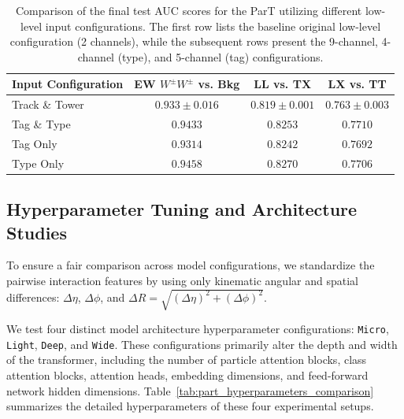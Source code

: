 \documentclass[12pt]{article}
\begin{document}
        \begin{table}[htbp]
            \centering
            \caption{Comparison of the final test AUC scores for the ParT utilizing different low-level input configurations. The first row lists the baseline original low-level configuration (2 channels), while the subsequent rows present the 9-channel, 4-channel (type), and 5-channel (tag) configurations.}
            \label{tab:refined_low_level_comparison}
            \begin{tabular}{l|ccc}
                \hline
                \hline
                Input Configuration & EW $W^\pm W^\pm$ vs. Bkg & LL vs. TX         & LX vs. TT         \\ \hline
                Track \& Tower      & $0.933 \pm 0.016$        & $0.819 \pm 0.001$ & $0.763 \pm 0.003$ \\
                Tag \& Type         & $0.9433$                 & $0.8253$          & $0.7710$          \\
                Tag Only            & $0.9314$                 & $0.8242$          & $0.7692$          \\
                Type Only           & $0.9458$                 & $0.8270$          & $0.7706$          \\
                \hline
                \hline
            \end{tabular}
        \end{table}


	\subsection{Hyperparameter Tuning and Architecture Studies}%
	\label{sub:hyperparameter_tuning_and_architecture_studies}

		To ensure a fair comparison across model configurations, we standardize the pairwise interaction features by using only kinematic angular and spatial differences: $\Delta\eta$, $\Delta\phi$, and $\Delta R = \sqrt{(\Delta\eta)^2 + (\Delta\phi)^2}$.

		We test four distinct model architecture hyperparameter configurations: \texttt{Micro}, \texttt{Light}, \texttt{Deep}, and \texttt{Wide}. These configurations primarily alter the depth and width of the transformer, including the number of particle attention blocks, class attention blocks, attention heads, embedding dimensions, and feed-forward network hidden dimensions. Table~\ref{tab:part_hyperparameters_comparison} summarizes the detailed hyperparameters of these four experimental setups.
\end{document}
